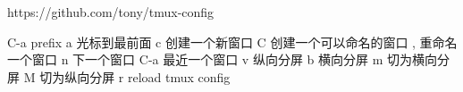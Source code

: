 https://github.com/tony/tmux-config

C-a  prefix
  a 光标到最前面
  c 创建一个新窗口
  C 创建一个可以命名的窗口
  , 重命名一个窗口
  n 下一个窗口
  C-a  最近一个窗口 
  v 纵向分屏
  b 横向分屏
  m 切为横向分屏
  M 切为纵向分屏
  r reload tmux config

  
